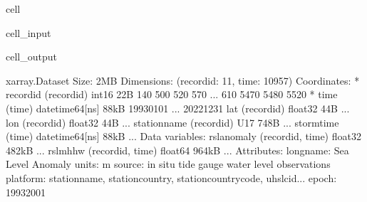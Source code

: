 \documentclass[letterpaper,10pt,english]{jupyterBook}
\begin{document}
\begin{sphinxuseclass}{cell}\begin{sphinxVerbatimInput}

\begin{sphinxuseclass}{cell_input}
\begin{sphinxVerbatim}[commandchars=\\\{\}]
\end{sphinxVerbatim}

\end{sphinxuseclass}\end{sphinxVerbatimInput}
\begin{sphinxVerbatimOutput}

\begin{sphinxuseclass}{cell_output}
\begin{sphinxVerbatim}[commandchars=\\\{\}]
\PYGZlt{}xarray.Dataset\PYGZgt{} Size: 2MB
Dimensions:       (record\PYGZus{}id: 11, time: 10957)
Coordinates:
  * record\PYGZus{}id     (record\PYGZus{}id) int16 22B 140 500 520 570 ... 610 5470 5480 5520
  * time          (time) datetime64[ns] 88kB 1993\PYGZhy{}01\PYGZhy{}01 ... 2022\PYGZhy{}12\PYGZhy{}31
    lat           (record\PYGZus{}id) float32 44B ...
    lon           (record\PYGZus{}id) float32 44B ...
    station\PYGZus{}name  (record\PYGZus{}id) \PYGZlt{}U17 748B ...
    storm\PYGZus{}time    (time) datetime64[ns] 88kB ...
Data variables:
    rsl\PYGZus{}anomaly   (record\PYGZus{}id, time) float32 482kB ...
    rsl\PYGZus{}mhhw      (record\PYGZus{}id, time) float64 964kB ...
Attributes:
    long\PYGZus{}name:  Sea Level Anomaly
    units:      m
    source:     in situ tide gauge water level observations
    platform:   station\PYGZus{}name, station\PYGZus{}country, station\PYGZus{}country\PYGZus{}code, uhslc\PYGZus{}id...
    epoch:      1993\PYGZhy{}2001
\end{sphinxVerbatim}

\end{sphinxuseclass}\end{sphinxVerbatimOutput}

\end{sphinxuseclass}
\end{document}
